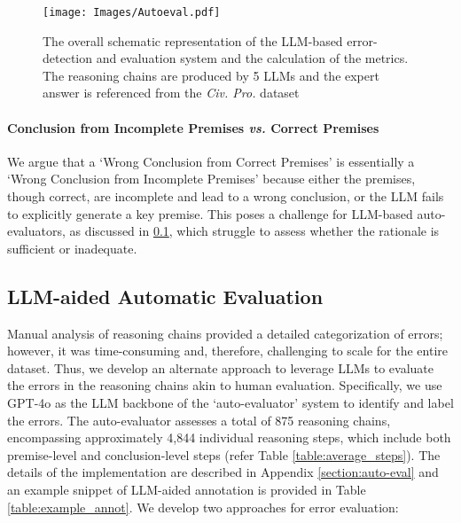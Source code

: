 
\begin{figure*}[t]
    \centering     
    \texttt{[image: Images/Autoeval.pdf]}
    \caption{The overall schematic representation of the LLM-based error-detection and evaluation system and the calculation of the metrics. The reasoning chains are produced by 5 LLMs and the expert answer is referenced from the \textit{Civ. Pro.} dataset}
    \label{fig:autoeval}
\end{figure*}

\paragraph{Conclusion from Incomplete Premises \textit{vs.} Correct Premises}
We argue that a `Wrong Conclusion from Correct Premises' is essentially a `Wrong Conclusion from Incomplete Premises' because either the premises, though correct, are incomplete and lead to a wrong conclusion, or the LLM fails to explicitly generate a key premise. This poses a challenge for LLM-based auto-evaluators, as discussed in \textsection \ref{section:llm_aided_eval}, which struggle to assess whether the rationale is sufficient or inadequate.

\subsection{LLM-aided Automatic Evaluation}
\label{section:llm_aided_eval}
Manual analysis of reasoning chains provided a detailed categorization of errors; however, it was time-consuming and, therefore, challenging to scale for the entire dataset. Thus, we develop an alternate approach to leverage LLMs to evaluate the errors in the reasoning chains akin to human evaluation. Specifically, we use GPT-4o as the LLM backbone of the `auto-evaluator' system to identify and label the errors. The auto-evaluator assesses a total of 875 reasoning chains, encompassing approximately 4,844 individual reasoning steps, which include both premise-level and conclusion-level steps (refer Table \ref{table:average_steps}). The details of the implementation are described in Appendix \ref{section:auto-eval} and an example snippet of LLM-aided annotation is provided in Table \ref{table:example_annot}. We develop two approaches for error evaluation:     

